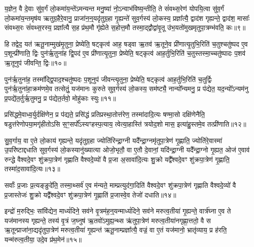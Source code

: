 {\anuvakamend[{ध्रु॒वस्तस्मा॑दे॒व य॒ज्ञस्यैका॒न्नच॑त्वारि॒ꣳ॒शच्च॑॥२॥}]}

य॒ज्ञेन॒ वै दे॒वाः सु॑व॒र्गं लो॒कमा॑य॒न्ते॑\-ऽमन्यन्त मनु॒ष्या॑ नो॒\-ऽन्वाभ॑विष्य॒न्तीति॒ ते सं॑वथ्स॒रेण॑ योपयि॒त्वा सु॑व॒र्गं लो॒कमा॑य॒न्तमृष॑य ऋतुग्र॒हैरे॒वानु॒ प्राजा॑न॒न्॒यदृ॑तुग्र॒हा गृ॒ह्यन्ते॑ सुव॒र्गस्य॑ लो॒कस्य॒ प्रज्ञा᳚त्यै॒ द्वाद॑श गृह्यन्ते॒ द्वाद॑श॒ मासाः᳚ संवथ्स॒रः सं॑वथ्स॒रस्य॒ प्रज्ञा᳚त्यै स॒ह प्र॑थ॒मौ गृ॑ह्येते स॒होत्त॒मौ तस्मा॒द्द्वौद्वा॑वृ॒तू उ॑भ॒यतो॑मुखमृतुपा॒त्रम्भ॑वति॒ कः॥९॥

हि तद्वेद॒ यत॑ ऋतू॒नाम्मुख॑मृ॒तुना॒ प्रेष्येति॒ षट्कृत्व॑ आह॒ षड्वा ऋ॒तव॑ ऋ॒तूने॒व प्री॑णात्यृ॒तुभि॒रिति॑ च॒तुश्चतु॑ष्पद ए॒व प॒शून्प्री॑णाति॒ द्विः पुन॑र्\mbox{}ऋ॒तुना॑ह द्वि॒पद॑ ए॒व प्री॑णात्यृ॒तुना॒ प्रेष्येति॒ षट्कृत्व॑ आह॒र्तुभि॒रिति॑ च॒तुस्तस्मा॒च्चतु॑ष्पादः प॒शव॑ ऋ॒तूनुप॑ जीवन्ति॒ द्विः॥१०॥

पुन॑र्\mbox{}ऋ॒तुना॑ह॒ तस्मा᳚द्द्वि॒पाद॒श्चतु॑ष्पदः प॒शूनुप॑ जीवन्त्यृ॒तुना॒ प्रेष्येति॒ षट्कृत्व॑ आह॒र्तुभि॒रिति॑ च॒तुर्द्विः पुन॑र्\mbox{}ऋ॒तुना॑हा॒क्रम॑णमे॒व तत्सेतुं॒ यज॑मानः कुरुते सुव॒र्गस्य॑ लो॒कस्य॒ सम॑ष्ट्यै॒ नान्यो᳚न्यमनु॒ प्र प॑द्येत॒ यद॒न्यो᳚\-ऽन्यम॑नु प्र॒पद्ये॑त॒र्तुर्\mbox{}ऋ॒तुमनु॒ प्र प॑द्येत॒र्तवो॒ मोहु॑काः स्युः॥११॥

प्रसि॑द्धमे॒वाध्व॒र्युर्दक्षि॑णेन॒ प्र प॑द्यते॒ प्रसि॑द्धं प्रतिप्रस्था॒तोत्त॑रेण॒ तस्मा॑दादि॒त्यः षण्मा॒सो दक्षि॑णेनैति॒ षडुत्त॑रेणोपया॒मगृ॑हीतो\-ऽसि स॒ꣳ॒सर्पो᳚\-ऽस्यꣳहस्प॒त्याय॒ त्वेत्या॒हास्ति॑ त्रयोद॒शो मास॒ इत्या॑हु॒स्तमे॒व तत्प्री॑णाति॥१२॥

{\anuvakamend[{को जी॑वन्ति॒ द्विः स्यु॒श्चतु॑स्त्रिꣳशच्च॥३॥}]}

सु॒व॒र्गाय॒ वा ए॒ते लो॒काय॑ गृह्यन्ते॒ यदृ॑तुग्र॒हा ज्योति॑रिन्द्रा॒ग्नी यदै᳚न्द्रा॒ग्नमृ॑तुपा॒त्रेण॑ गृ॒ह्णाति॒ ज्योति॑रे॒वास्मा॑ उ॒परि॑ष्टाद्दधाति सुव॒र्गस्य॑ लो॒कस्यानु॑ख्यात्या ओजो॒भृतौ॒ वा ए॒तौ दे॒वानां॒ यदि॑न्द्रा॒ग्नी यदै᳚न्द्रा॒ग्नो गृ॒ह्यत॒ ओज॑ ए॒वाव॑ रुन्द्धे वैश्वदे॒वꣳ शु॑क्रपा॒त्रेण॑ गृह्णाति वैश्वदे॒व्यो॑ वै प्र॒जा अ॒सावा॑दि॒त्यः शु॒क्रो यद्वै᳚श्वदे॒वꣳ शु॑क्रपा॒त्रेण॑ गृ॒ह्णाति॒ तस्मा॑द॒सावा॑दि॒त्यः॥१३॥

सर्वाः᳚ प्र॒जाः प्र॒त्यङ्ङुदे॑ति॒ तस्मा॒थ्सर्व॑ ए॒व म॑न्यते॒ माम्प्रत्युद॑गा॒दिति॑ वैश्वदे॒वꣳ शु॑क्रपा॒त्रेण॑ गृह्णाति वैश्वदे॒व्यो॑ वै प्र॒जास्तेजः॑ शु॒क्रो यद्वै᳚श्वदे॒वꣳ शु॑क्रपा॒त्रेण॑ गृ॒ह्णाति॑ प्र॒जास्वे॒व तेजो॑ दधाति॥१४॥

{\anuvakamend[{तस्मा॑द॒सावा॑दि॒त्यस्त्रि॒ꣳ॒शच्च॑॥४॥}]}

इन्द्रो॑ म॒रुद्भिः॒ सांवि॑द्येन॒ माध्यं॑दिने॒ सव॑ने वृ॒त्रम॑ह॒न्॒यन्माध्यं॑दिने॒ सव॑ने मरुत्व॒तीया॑ गृ॒ह्यन्ते॒ वार्त्र॑घ्ना ए॒व ते यज॑मानस्य गृह्यन्ते॒ तस्य॑ वृ॒त्रं ज॒घ्नुष॑ ऋ॒तवो॑\-ऽमुह्य॒न्थ्स ऋ॑तुपा॒त्रेण॑ मरुत्व॒तीया॑नगृह्णा॒त्ततो॒ वै स ऋ॒तून्प्राजा॑ना॒द्यदृ॑तुपा॒त्रेण॑ मरुत्व॒तीया॑ गृ॒ह्यन्त॑ ऋतू॒नाम्प्रज्ञा᳚त्यै॒ वज्रं॒ वा ए॒तं यज॑मानो॒ भ्रातृ॑व्याय॒ प्र ह॑रति॒ यन्म॑रुत्व॒तीया॒ उदे॒व प्र॑थ॒मेन॑॥१५॥

